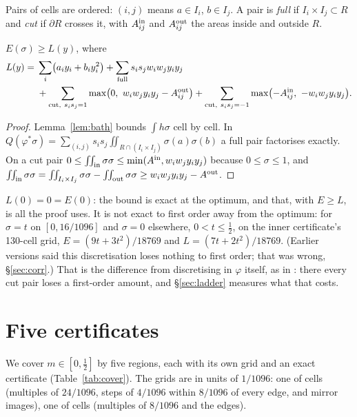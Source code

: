 \documentclass[11pt]{article}
\newcommand{\vphi}{\varphi}
\begin{document}
Pairs of cells are ordered: $(i,j)$ means $a\in I_i$, $b\in I_j$. A pair is \emph{full} if $I_i\times I_j\subset R$ and \emph{cut} if $\partial R$ crosses it, with $A^{\rm in}_{ij}$ and $A^{\rm out}_{ij}$ the areas inside and outside $R$.

\begin{lemma}\label{lem:disc}
$E(\sigma)\ge L(y)$, where
\begin{align*}
L(y)={}&\sum_i\bigl(a_iy_i+b_iy_i^2\bigr)+\sum_{\text{full}}s_is_jw_iw_jy_iy_j\\
&+\sum_{\text{cut},\ s_is_j=1}\max\bigl(0,\ w_iw_jy_iy_j-A^{\rm out}_{ij}\bigr)
+\sum_{\text{cut},\ s_is_j=-1}\max\bigl(-A^{\rm in}_{ij},\ -w_iw_jy_iy_j\bigr).
\end{align*}
\end{lemma}
\begin{proof}
Lemma~\ref{lem:bath} bounds $\int h\sigma$ cell by cell. In $Q(\vphi^*\sigma)=\sum_{(i,j)}s_is_j\iint_{R\cap(I_i\times I_j)}\sigma(a)\sigma(b)$ a full pair factorises exactly. On a cut pair $0\le\iint_{\rm in}\sigma\sigma\le\min(A^{\rm in},w_iw_jy_iy_j)$ because $0\le\sigma\le1$, and $\iint_{\rm in}\sigma\sigma=\iint_{I_i\times I_j}\sigma\sigma-\iint_{\rm out}\sigma\sigma\ge w_iw_jy_iy_j-A^{\rm out}$.
\end{proof}

$L(0)=0=E(0)$: the bound is exact at the optimum, and that, with $E\ge L$, is all the proof uses. It is not exact to first order away from the optimum: for $\sigma=t$ on $[0,16/1096]$ and $\sigma=0$ elsewhere, $0<t\le\frac12$, on the inner certificate's 130-cell grid, $E=(9t+3t^2)/18769$ and $L=(7t+2t^2)/18769$. (Earlier versions said this discretisation loses nothing to first order; that was wrong, \S\ref{sec:corr}.) That is the difference from discretising in $\vphi$ itself, as in \cite{PRS}: there every cut pair loses a first-order amount, and \S\ref{sec:ladder} measures what that costs.

\section{Five certificates}\label{sec:certs}

We cover $m\in[0,\frac12]$ by five regions, each with its own grid and an exact certificate (Table~\ref{tab:cover}). The grids are in units of $1/1096$: one of \GridAN{} cells (multiples of $24/1096$, steps of $4/1096$ within $8/1096$ of every edge, and mirror images), one of \GridBN{} cells (multiples of $8/1096$ and the edges).
\end{document}
